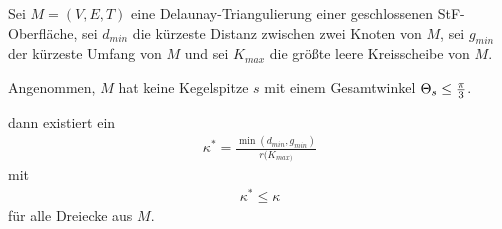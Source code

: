 \begin{lemma}
\label{lem:Obergrenze}
Sei $M = (V,E,T)$ eine Delaunay-Triangulierung   einer geschlossenen StF-Oberfläche, sei $d_{min}$ die kürzeste Distanz zwischen zwei Knoten von $M$, sei $g_{min}$ der kürzeste Umfang von $M$ und sei $K_{max}$ die größte leere Kreisscheibe von $M$.

Angenommen, $M$ hat keine Kegelspitze $s$ mit einem Gesamtwinkel $\gesamtwinkel*[s] \leq \frac{\pi}{3}$. 

dann  existiert ein 
\begin{align*}
    \kappa^* = \frac{\min(d_{min}, g_{min} )}{r(K_{max)}}
\end{align*}
mit 
\begin{align*}
 \kappa^* \leq \kappa   
\end{align*}
für alle Dreiecke aus $M$.




\end{lemma}



